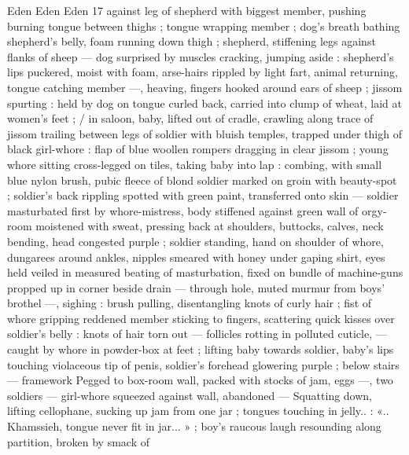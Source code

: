 Eden Eden Eden 17
against leg of shepherd with biggest member, pushing burning
tongue between thighs ; tongue wrapping member ; dog's breath
bathing shepherd's belly, foam running down thigh ; shepherd,
stiffening legs against flanks of sheep — dog surprised by muscles
cracking, jumping aside : shepherd's lips puckered, moist with foam,
arse-hairs rippled by light fart, animal returning, tongue catching
member —, heaving, fingers hooked around ears of sheep ; jissom
spurting : held by dog on tongue curled back, carried into clump of
wheat, laid at women’s feet ; / in saloon, baby, lifted out of cradle,
crawling along trace of jissom trailing between legs of soldier with
bluish temples, trapped under thigh of black girl-whore : flap of blue
woollen rompers dragging in clear jissom ; young whore sitting
cross-legged on tiles, taking baby into lap : combing, with small blue
nylon brush, pubic fleece of blond soldier marked on groin with
beauty-spot ; soldier's back rippling spotted with green paint,
transferred onto skin — soldier masturbated first by whore-mistress,
body stiffened against green wall of orgy-room moistened with
sweat, pressing back at shoulders, buttocks, calves, neck bending,
head congested purple ; soldier standing, hand on shoulder of
whore, dungarees around ankles, nipples smeared with honey under
gaping shirt, eyes held veiled in measured beating of masturbation,
fixed on bundle of machine-guns propped up in corner beside drain
— through hole, muted murmur from boys’ brothel —, sighing :
brush pulling, disentangling knots of curly hair ; fist of whore
gripping reddened member sticking to fingers, scattering quick
kisses over soldier's belly : knots of hair torn out — follicles rotting
in polluted cuticle, — caught by whore in powder-box at feet ; lifting
baby towards soldier, baby's lips touching violaceous tip of penis,
soldier's forehead glowering purple ; below stairs — framework
Pegged to box-room wall, packed with stocks of jam, eggs —, two
soldiers — girl-whore squeezed against wall, abandoned —
Squatting down, lifting cellophane, sucking up jam from one jar ;
tongues touching in jelly.. : «.. Khamssieh, tongue never fit in jar... » ;
boy's raucous laugh resounding along partition, broken by smack of

